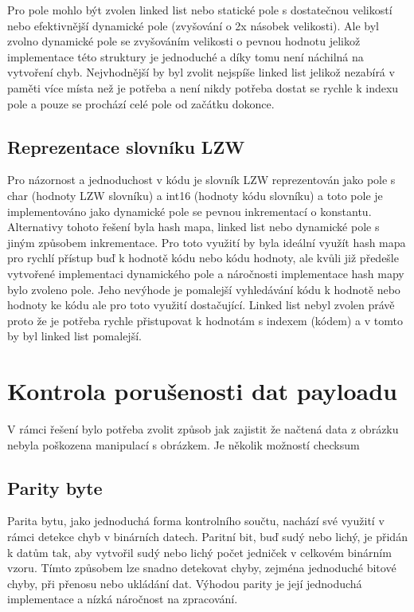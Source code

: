 \documentclass[12pt]{report}
\begin{document}
    Pro pole mohlo být zvolen linked list nebo statické pole s dostatečnou velikostí nebo efektivnější dynamické pole (zvyšování o 2x násobek velikosti). Ale byl zvolno dynamické pole se zvyšováním velikosti o pevnou hodnotu jelikož implementace této struktury je jednoduché a díky tomu není náchilná na vytvoření chyb. Nejvhodnější by byl zvolit nejspíše linked list jelikož nezabírá v paměti více místa než je potřeba a není nikdy potřeba dostat se rychle k indexu pole a pouze se prochází celé pole od začátku dokonce.

    \subsection{Reprezentace slovníku LZW}
    Pro názornost a jednoduchost v kódu je slovník LZW reprezentován jako pole s char (hodnoty LZW slovníku) a int16 (hodnoty kódu slovníku) a toto pole je implementováno jako dynamické pole se pevnou inkrementací o konstantu. Alternativy tohoto řešení byla hash mapa, linked list nebo dynamické pole s jiným způsobem inkrementace. Pro toto využití by byla ideální využít hash mapa pro rychlí přístup buď k hodnotě kódu nebo kódu hodnoty, ale kvůli již předešle vytvořené implementaci dynamického pole a náročnosti implementace hash mapy bylo zvoleno pole. Jeho nevýhode je pomalejší vyhledávání kódu k hodnotě nebo hodnoty ke kódu ale pro toto využití dostačující. Linked list nebyl zvolen právě proto že je potřeba rychle přistupovat k hodnotám s indexem (kódem) a v tomto by byl linked list pomalejší.


    \section{Kontrola porušenosti dat payloadu}
    V rámci řešení bylo potřeba zvolit způsob jak zajistit že načtená data z obrázku nebyla poškozena manipulací s obrázkem. Je několik možností checksum
\subsection{Parity byte}
Parita bytu, jako jednoduchá forma kontrolního součtu, nachází své využití v rámci detekce chyb v binárních datech. Paritní bit, buď sudý nebo lichý, je přidán k datům tak, aby vytvořil sudý nebo lichý počet jedniček v celkovém binárním vzoru. Tímto způsobem lze snadno detekovat chyby, zejména jednoduché bitové chyby, při přenosu nebo ukládání dat. Výhodou parity je její jednoduchá implementace a nízká náročnost na zpracování.
\end{document}
